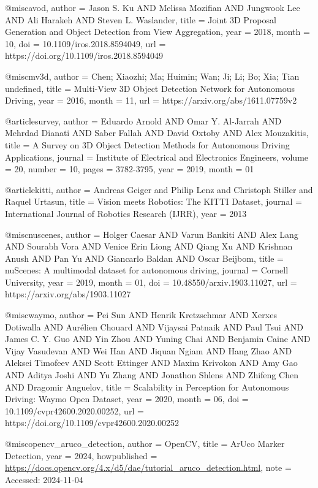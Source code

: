 \begin{bibtex-entries}
@misc{avod,
author = {Jason S. Ku AND Melissa Mozifian AND Jungwook Lee AND Ali Harakeh AND Steven L. Waslander},
title = {Joint 3D Proposal Generation and Object Detection from View Aggregation},
year = {2018},
month = {10},
doi = {10.1109/iros.2018.8594049},
url = {https://doi.org/10.1109/iros.2018.8594049}
}

@misc{mv3d,
author = {Chen; Xiaozhi; Ma; Huimin; Wan; Ji; Li; Bo; Xia; Tian undefined},
title = {Multi-View 3D Object Detection Network for Autonomous Driving},
year = {2016},
month = {11},
url = {https://arxiv.org/abs/1611.07759v2}
}

@article{survey,
author = {Eduardo Arnold AND Omar Y. Al-Jarrah AND Mehrdad Dianati AND Saber Fallah AND David Oxtoby AND Alex Mouzakitis},
title = {A Survey on 3D Object Detection Methods for Autonomous Driving Applications},
journal = {Institute of Electrical and Electronics Engineers},
volume = {20},
number = {10},
pages = {3782-3795},
year = {2019},
month = {01}
}

@article{kitti,
  author = {Andreas Geiger and Philip Lenz and Christoph Stiller and Raquel Urtasun},
  title = {Vision meets Robotics: The KITTI Dataset},
  journal = {International Journal of Robotics Research (IJRR)},
  year = {2013}
}

@misc{nuscenes,
author = {Holger Caesar AND Varun Bankiti AND Alex Lang AND Sourabh Vora AND Venice Erin Liong AND Qiang Xu AND Krishnan Anush AND Pan Yu AND Giancarlo Baldan AND Oscar Beijbom},
title = {nuScenes: A multimodal dataset for autonomous driving},
journal = {Cornell University},
year = {2019},
month = {01},
doi = {10.48550/arxiv.1903.11027},
url = {https://arxiv.org/abs/1903.11027}
}

@misc{waymo,
author = {Pei Sun AND Henrik Kretzschmar AND Xerxes Dotiwalla AND Aurélien Chouard AND Vijaysai Patnaik AND Paul Tsui AND James C. Y. Guo AND Yin Zhou AND Yuning Chai AND Benjamin Caine AND Vijay Vasudevan AND Wei Han AND Jiquan Ngiam AND Hang Zhao AND Aleksei Timofeev AND Scott Ettinger AND Maxim Krivokon AND Amy Gao AND Aditya Joshi AND Yu Zhang AND Jonathon Shlens AND Zhifeng Chen AND Dragomir Anguelov},
title = {Scalability in Perception for Autonomous Driving: Waymo Open Dataset},
year = {2020},
month = {06},
doi = {10.1109/cvpr42600.2020.00252},
url = {https://doi.org/10.1109/cvpr42600.2020.00252}
}

@misc{opencv_aruco_detection,
  author       = {OpenCV},
  title        = {ArUco Marker Detection},
  year         = {2024},
  howpublished = {\url{https://docs.opencv.org/4.x/d5/dae/tutorial_aruco_detection.html}},
  note         = {Accessed: 2024-11-04}
}
\end{bibtex-entries}